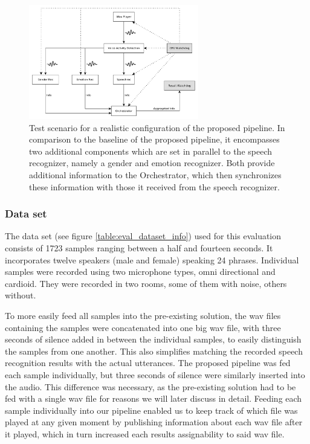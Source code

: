 \begin{figure}[]
	\centering
	\includegraphics[width=0.66\textwidth]{diagrams/eval_pipeline_5.pdf}
	\caption{Test scenario for a realistic configuration of the proposed pipeline.
		In comparison to the baseline of the proposed pipeline, it encompasses two additional components which are set in parallel to the speech recognizer, namely a gender and emotion recognizer.
		Both provide additional information to the Orchestrator, which then synchronizes these information with those it received from the speech recognizer.}
	\label{pic:eval_p5_diag}
\end{figure}

\subsubsection{Data set}
\label{eval:dataset:dataset}

The data set (see figure \ref{table:eval_dataset_info}) used for this evaluation consists of 1723 samples ranging between a half and fourteen seconds.
It incorporates twelve speakers (male and female) speaking 24 phrases. 
Individual samples were recorded using two microphone types, omni directional and cardioid.
They were recorded in two rooms, some of them with noise, others without.

To more easily feed all samples into the pre-existing solution, the wav files containing the samples were concatenated into one big wav file, with three seconds of silence added in between the individual samples, to easily distinguish the samples from one another.
This also simplifies matching the recorded speech recognition results with the actual utterances.
The proposed pipeline was fed each sample individually, but three seconds of silence were similarly inserted into the audio.
This difference was necessary, as the pre-existing solution had to be fed with a single wav file for reasons we will later discuss in detail.
Feeding each sample individually into our pipeline enabled us to keep track of which file was played at any given moment by publishing information about each wav file after it played, which in turn increased each results assignability to said wav file.

